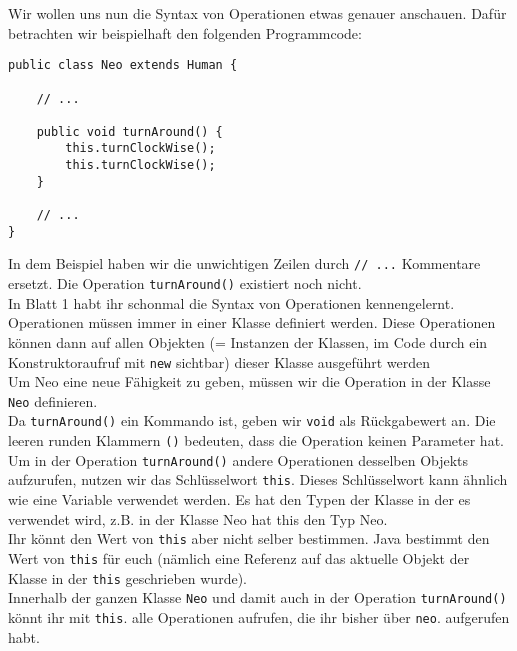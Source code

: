 \begin{Infobox}
    Wir wollen uns nun die Syntax von Operationen etwas genauer anschauen. 
    Dafür betrachten wir beispielhaft den folgenden Programmcode:

    \begin{lstlisting}[numbers=none]
public class Neo extends Human {

    // ...

    public void turnAround() {
        this.turnClockWise();
        this.turnClockWise();
    }

    // ...
}
    \end{lstlisting}

    In dem Beispiel haben wir die unwichtigen Zeilen durch \lstinline{// ...} Kommentare ersetzt.
    Die Operation \lstinline{turnAround()} existiert noch nicht.\\

    In Blatt 1 habt ihr schonmal die Syntax von Operationen kennengelernt.
    Operationen müssen immer in einer Klasse definiert werden.
    Diese Operationen können dann auf allen Objekten (= Instanzen
der Klassen, im Code durch ein Konstruktoraufruf mit \lstinline{new} sichtbar) dieser Klasse ausgeführt
werden\\

    Um Neo eine neue Fähigkeit zu geben, müssen wir die Operation in der Klasse \lstinline{Neo} definieren.\\

    Da \lstinline{turnAround()} ein Kommando ist, geben wir \lstinline{void} als Rückgabewert an.
    Die leeren runden Klammern \lstinline{()} bedeuten, dass die Operation keinen Parameter hat.\\

    Um in der Operation \lstinline{turnAround()} andere Operationen desselben Objekts aufzurufen, nutzen wir das Schlüsselwort \lstinline{this}.
    Dieses Schlüsselwort kann ähnlich wie eine Variable verwendet werden. Es hat den Typen der Klasse in der es verwendet wird, z.B. in der Klasse Neo hat this den Typ Neo.\\

    Ihr könnt den Wert von \lstinline{this} aber nicht selber bestimmen.
    Java bestimmt den Wert von \lstinline{this} für euch (nämlich eine Referenz auf das aktuelle Objekt der Klasse in der \lstinline{this} geschrieben wurde).\\

    Innerhalb der ganzen Klasse \lstinline{Neo} und damit auch in der Operation \lstinline{turnAround()} könnt ihr mit \lstinline{this}. alle Operationen aufrufen, die ihr bisher über \lstinline{neo}. aufgerufen habt.

\end{Infobox}


